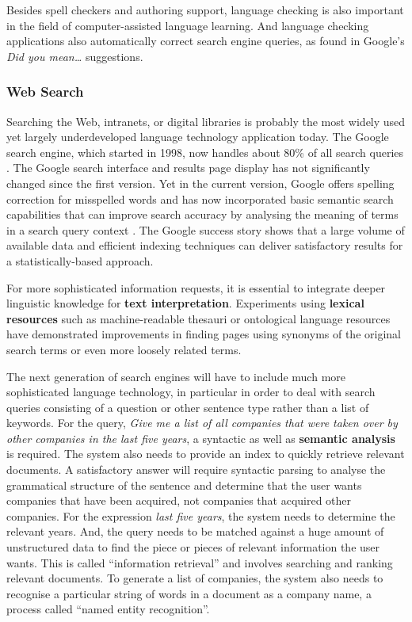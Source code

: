 \begin{multicols}{2}
Besides spell checkers and authoring support, language checking is also important in the field of computer-assisted language learning.
And language checking applications also automatically correct search engine queries, as found in Google's \textit{Did you mean\dots } suggestions.

\subsubsection{Web Search}

Searching the Web, intranets, or digital libraries is probably the most widely used yet largely underdeveloped language technology application today.
The Google search engine, which started in 1998, now handles about 80\% of all search queries \cite{Meta16}.
The Google search interface and results page display has not significantly changed since the first version.
Yet in the current version, Google offers spelling correction for misspelled words and has now incorporated basic semantic search capabilities that can improve search accuracy by analysing the meaning of terms in a search query context \cite{Meta17}.
The Google success story shows that a large volume of available data and efficient indexing techniques can deliver satisfactory results for a statistically-based approach.

For more sophisticated information requests, it is essential to integrate deeper linguistic knowledge for \textbf{text interpretation}.
Experiments using \textbf{lexical resources} such as machine-readable thesauri or ontological language resources have demonstrated improvements in finding pages using synonyms of the original search terms or even more loosely related terms.

The next generation of search engines will have to include much more sophisticated language technology, in particular in order to deal with search queries consisting of a question or other sentence type rather than a list of keywords.
For the query, \textit{Give me a list of all companies that were taken over by other companies in the last five years}, a syntactic as well as \textbf{semantic analysis} is required.
The system also needs to provide an index to quickly retrieve relevant documents.
A satisfactory answer will require syntactic parsing to analyse the grammatical structure of the sentence and determine that the user wants companies that have been acquired, not companies that acquired other companies.
For the expression \textit{last five years}, the system needs to determine the relevant years.
And, the query needs to be matched against a huge amount of unstructured data to find the piece or pieces of relevant information the user wants.
This is called ``information retrieval'' and involves searching and ranking relevant documents.
To generate a list of companies, the system also needs to recognise a particular string of words in a document as a company name, a process called ``named entity recognition''.


\end{multicols}
